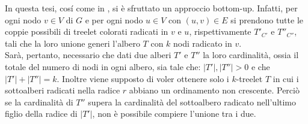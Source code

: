 In questa tesi, cos\'i come in \cite{bressan2019motivo}, si \`e sfruttato un approccio bottom-up. Infatti, per ogni nodo $ v \in V $ di $ G $ e per ogni nodo $ u \in V$ con $ (u,v)\in E $ si prendono tutte le coppie possibili di treelet colorati radicati  in $ v $ e $ u $, rispettivamente $ T'_{C'} $ e $ T''_{C''} $, tali che la loro unione generi l'albero $ T $ con $ k $ nodi radicato in $ v $.\\
Sar\`a, pertanto, necessario che dati due alberi $ T' $ e $ T'' $ la loro cardinalit\`a, ossia il totale del numero di nodi in ogni albero, sia tale che: $ |T'|,|T''|>0 $ e che $ |T'| + |T''| = k $.
Inoltre viene supposto di voler ottenere solo i $ k $-treelet $ T $ in cui i sottoalberi radicati nella radice $ r $ abbiano un ordinamento non crescente.
Perci\`o se la cardinalit\`a di $ T'' $ supera la cardinalit\`a del sottoalbero radicato nell'ultimo figlio della radice di $ |T'| $, non \`e possibile compiere l'unione tra i due.

